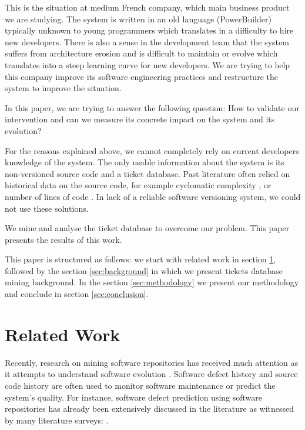 \documentclass[10pt,conference]{IEEEtran}
\begin{document}
This is the situation at medium French company, which main business product we are studying.
The system is written in an old language (PowerBuilder) typically unknown to young programmers which translates in a difficulty to hire new developers.
There is also a sense in the development team that the system suffers from architecture erosion and is difficult to maintain or evolve which translates into a steep learning curve for new developers.
We are trying to help this company improve its software engineering practices and restructure the system to improve the situation.


In this paper, we are trying to answer the following question:
How to validate our intervention and can we measure its concrete impact on the system and its evolution?

For the reasons explained above, we cannot completely rely on current developers knowledge of the system.
The only usable information about the system is its non-versioned source code and a ticket database.
Past literature often relied on historical data on the source code, for example
cyclomatic complexity \citep*{gill91}, or number of lines of code \citep*{port18}.
In lack of a reliable software versioning system, we could not use these solutions.


We mine and analyse the ticket database to overcome our problem.
This paper presents the results of this work.

 This paper is structured as follows: we start with related work in section \ref{sec:related-work}, followed by the section \ref{sec:background} in which we present tickets database mining background. 
 In the section \ref{sec:methodology} we present our methodology and conclude in section \ref{sec:conclusion}.
 
\section{Related Work}
\label{sec:related-work}
Recently, research on mining software repositories has received much attention as it attempts to understand software evolution \citep*{Zhan10a}.
Software defect history and source code history are often used to monitor software maintenance or predict the system's quality. 
For instance, software defect prediction using software repositories has already been extensively discussed in the literature as witnessed by many literature surveys: \citep*{Catal09,Hall12,Hoss17,Li19a,malh15}.
\end{document}
